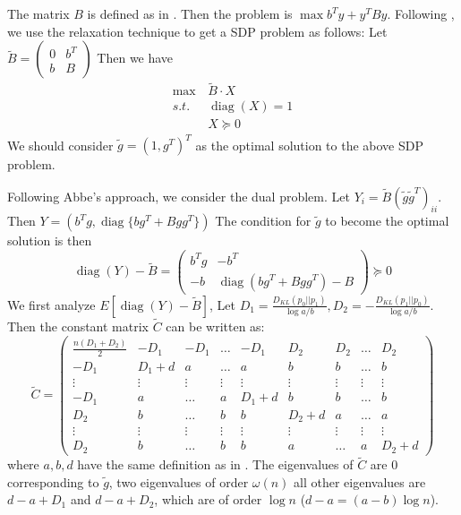 \documentclass{article}
\DeclareMathOperator{\diag}{diag}
\begin{document}
The matrix $B$ is defined as in \cite{abbe}.
Then the problem is $\max b^T y + y^T B y$.
Following \cite{wang2019tightness}, we use the relaxation
technique to get a SDP problem as follows:
Let $\tilde{B} = \begin{pmatrix} 0 & b^T \\ b & B \end{pmatrix}$
Then we have
\begin{align*}
\max\, & \tilde{B} \cdot X \\
s.t.\,& \diag(X) = 1 \\
& X \succeq 0
\end{align*}
We should consider $\tilde{g} = (1,g^T)^T$ as the optimal solution to the above SDP problem.

Following Abbe's approach, we consider the dual problem. Let $Y_i = \tilde{B}(\tilde{g}\tilde{g}^T)_{ii}$.
Then $Y = (b^T g, \diag\{bg^T+Bgg^T\})$
The condition for $\tilde{g}$ to become the optimal solution is then
$$
\diag(Y) - \tilde{B}  = \begin{pmatrix} b^T g & -b^T \\ -b & \diag(bg^T + Bgg^T) - B \end{pmatrix}
\succeq 0
$$
We first analyze $E[\diag(Y) - \tilde{B}]$, Let $D_1 = \frac{D_{KL}(p_0||p_1)}{\log a/b},
D_2 = -\frac{D_{KL}(p_1||p_0)}{\log a/b}$. Then the constant matrix $\tilde{C}$ can be written as:
\begin{equation}
\tilde{C}=\begin{pmatrix}
\frac{n(D_1 + D_2)}{2} & -D_1 & -D_1& \dots & -D_1 & D_2 & D_2 & \dots & D_2 \\
-D_1 & D_1 + d & a & \dots & a & b & b & \dots & b \\
\vdots & \vdots & \vdots & \vdots & \vdots & \vdots & \vdots & \vdots & \vdots \\
-D_1 & a & \dots & a & D_1 + d & b & b & \dots & b \\
D_2 & b & \dots & b & b & D_2 + d  & a & \dots & a \\
\vdots & \vdots & \vdots & \vdots & \vdots &\vdots & \vdots & \vdots & \vdots \\
D_2 & b & \dots & b & b & a & \dots & a & D_2 + d 
\end{pmatrix}
\end{equation}
where $a,b,d$ have the same definition as in \cite{abbe}.
The eigenvalues of $\tilde{C}$ are $0$ corresponding to $\tilde{g}$, two eigenvalues of order $\omega(n)$
all other eigenvalues are $d-a+D_1$ and $d-a+D_2$, which are of order $\log n$ ($d-a=(a-b)\log n$).
\end{document}
